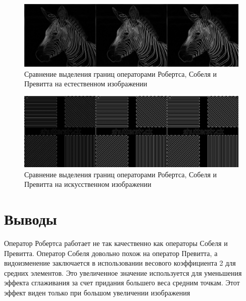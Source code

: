 \begin{figure}[H]
	\begin{center}
		\includegraphics[scale=0.2]{all_sravnenie_2.jpg}
		\caption{Сравнение выделения границ операторами Робертса, Собеля и Превитта на естественном изображении} 
		\label{pic:hist_orig} %
	\end{center}
\end{figure}
\begin{figure}[H]
	\begin{center}
		\includegraphics[scale=0.25]{all_sravnenie_1.jpg}
		\caption{Сравнение выделения границ операторами Робертса, Собеля и Превитта на искусственном изображении} 
		\label{pic:hist_orig} %
	\end{center}
\end{figure}


\section{Выводы}
Оператор Робертса работает не так качественно как операторы Собеля и Превитта. Оператор Собеля довольно похож на оператор Превитта, а видоизменение заключается в использовании весового коэффициента 2 для средних элементов. Это увеличенное значение используется для уменьшения эффекта сглаживания за счет придания большего веса средним точкам. Этот эффект виден только при большом увеличении изображения


